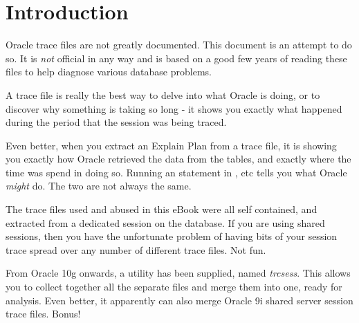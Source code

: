 \chapter{Introduction}\label{introduction}

Oracle trace files are not greatly documented. This document is an attempt to do so. It is \emph{not} official in any way and is based on a good few years of reading these files to help diagnose various database problems.

A trace file is really the best way to delve into what Oracle is doing, or to discover why something is taking so long - it shows you exactly what happened during the period that the session was being traced.

Even better, when you extract an Explain Plan from a trace file, it is showing you exactly how Oracle retrieved the data from the tables, and exactly where the time was spend in doing so. Running an  statement in ,  etc tells you what Oracle \emph{might} do. The two are not always the same.

The trace files used and abused in this eBook were all self contained, and extracted from a dedicated session on the database. If you are using shared sessions, then you have the unfortunate problem of having bits of your session trace spread over any number of different trace files. Not fun.

From Oracle 10g onwards, a utility has been supplied, named \emph{trcsess}. This allows you to collect together all the separate files and merge them into one, ready for analysis. Even better, it apparently can also merge Oracle 9i shared server session trace files. Bonus!